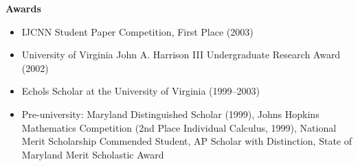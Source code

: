 \documentclass[10pt]{article}
\begin{document}
{\large \textbf{Awards}}
\begin{itemize}
  \item IJCNN Student Paper Competition, First Place (2003)
  \item University of Virginia John A. Harrison III Undergraduate Research Award (2002)
  \item Echols Scholar at the University of Virginia (1999--2003) 
  \item Pre-university: Maryland Distinguished Scholar (1999), Johns Hopkins Mathematics Competition (2nd Place Individual Calculus, 1999), National Merit Scholarship Commended Student, AP Scholar with Distinction, State of Maryland Merit Scholastic Award
\end{itemize}

\end{document}

